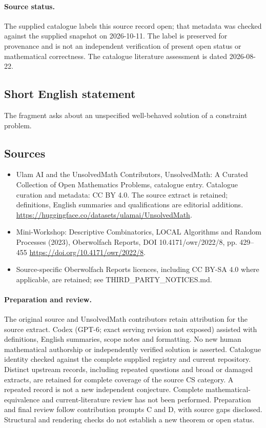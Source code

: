 \documentclass[11pt]{article}
\begin{document}
\paragraph{Source status.}
The supplied catalogue labels this source record open; that metadata was checked against the supplied snapshot on 2026-10-11. The label is preserved for provenance and is not an independent verification of present open status or mathematical correctness. The catalogue literature assessment is dated 2026-08-22.
\subsection{Short English statement}
The fragment asks about an unspecified well-behaved solution of a constraint problem.
\subsection{Sources}
\begin{itemize}
\item[\hypertarget{source:statement:1}{S1}] Ulam AI and the UnsolvedMath Contributors, UnsolvedMath: A Curated Collection of Open Mathematics Problems, catalogue entry. Catalogue curation and metadata: CC BY 4.0. The source extract is retained; definitions, English summaries and qualifications are editorial additions.
\url{https://huggingface.co/datasets/ulamai/UnsolvedMath}.
\item[\hypertarget{source:statement:2}{S2}] Mini-Workshop: Descriptive Combinatorics, LOCAL Algorithms and Random Processes (2023), Oberwolfach Reports, DOI 10.4171/owr/2022/8, pp. 429--455
\url{https://doi.org/10.4171/owr/2022/8}.
\item Source-specific Oberwolfach Reports licences, including CC BY-SA 4.0 where applicable, are retained; see THIRD\_PARTY\_NOTICES.md.
\end{itemize}
\paragraph{Preparation and review.}
The original source and UnsolvedMath contributors retain attribution for the source extract. Codex (GPT-6; exact serving revision not exposed) assisted with definitions, English summaries, scope notes and formatting. No new human mathematical authorship or independently verified solution is asserted. Catalogue identity checked against the complete supplied registry and current repository. Distinct upstream records, including repeated questions and broad or damaged extracts, are retained for complete coverage of the source CS category. A repeated record is not a new independent conjecture. Complete mathematical-equivalence and current-literature review has not been performed. Preparation and final review follow contribution prompts C and D, with source gaps disclosed. Structural and rendering checks do not establish a new theorem or open status.
\label{end:statement}
\end{document}
